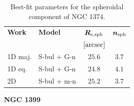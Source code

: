 \documentclass[preprint2]{emulateapj}
\begin{document}
  \begin{table}[h]
  \small
  \caption{Best-fit parameters for the spheroidal component of NGC 1374.}
  \begin{center}
  \begin{tabular}{llcc}
  \hline
  {\bf Work} & {\bf Model}   & $\bm R_{\rm e,sph}$    & $\bm n_{\rm sph}$ \\
    &  &  $[\rm arcsec]$ & \\
  \hline
  1D maj. & S-bul + G-n & $25.6$  &  $3.7$ \\
  1D eq.  & S-bul + G-n & $24.8$  &  $4.1$ \\
  2D      & S-bul + m-n & $25.2$  &  $3.7$ \\
  \hline
  \end{tabular}
  \end{center}
  \label{tab:n1374}
  \end{table}

  \clearpage\newpage\noindent
  {\bf NGC 1399 \\}
  
\end{document}
